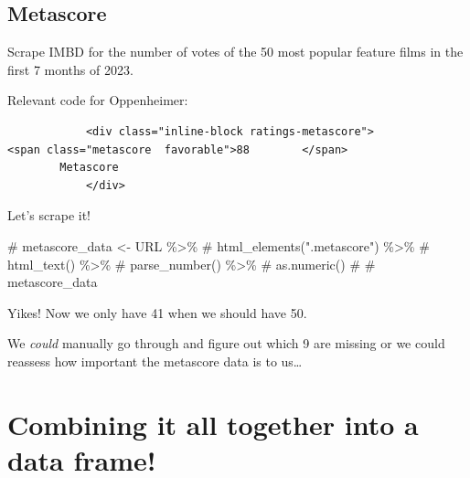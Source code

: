 \documentclass[
  letterpaper,
  DIV=11,
  numbers=noendperiod]{scrartcl}
\newenvironment{Shaded}{\begin{snugshade}}{\end{snugshade}}
\newcommand{\CommentTok}[1]{\textcolor[rgb]{0.37,0.37,0.37}{#1}}
\begin{document}
\hypertarget{metascore}{%
\subsection{Metascore}\label{metascore}}

Scrape IMBD for the number of votes of the 50 most popular feature films
in the first 7 months of 2023.

Relevant code for Oppenheimer:

\begin{verbatim}
            <div class="inline-block ratings-metascore">
<span class="metascore  favorable">88        </span>
        Metascore
            </div>
\end{verbatim}

Let's scrape it!

\begin{Shaded}
\begin{Highlighting}[]
\CommentTok{\# metascore\_data \textless{}{-} URL \%\textgreater{}\%}
\CommentTok{\#   html\_elements(".metascore") \%\textgreater{}\%}
\CommentTok{\#   html\_text() \%\textgreater{}\%}
\CommentTok{\#   parse\_number() \%\textgreater{}\%}
\CommentTok{\#   as.numeric()}
\CommentTok{\# }
\CommentTok{\# metascore\_data}
\end{Highlighting}
\end{Shaded}

\begin{tcolorbox}[enhanced jigsaw, arc=.35mm, left=2mm, colbacktitle=quarto-callout-warning-color!10!white, coltitle=black, leftrule=.75mm, rightrule=.15mm, opacitybacktitle=0.6, titlerule=0mm, colframe=quarto-callout-warning-color-frame, toptitle=1mm, breakable, bottomtitle=1mm, bottomrule=.15mm, opacityback=0, title=\textcolor{quarto-callout-warning-color}{\faExclamationTriangle}\hspace{0.5em}{Warning}, toprule=.15mm, colback=white]

Yikes! Now we only have 41 when we should have 50.

We \emph{could} manually go through and figure out which 9 are missing
or we could reassess how important the metascore data is to us\ldots{}

\end{tcolorbox}

\hypertarget{combining-it-all-together-into-a-data-frame}{%
\section{Combining it all together into a data
frame!}\label{combining-it-all-together-into-a-data-frame}}
\end{document}
